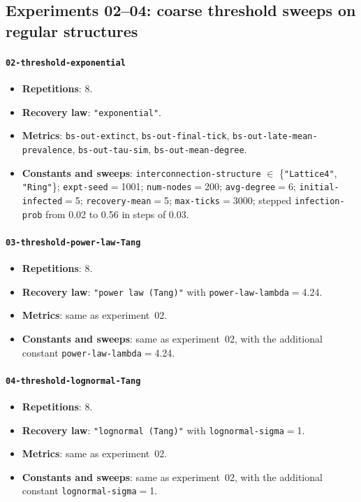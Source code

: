 \documentclass[11pt,a4paper]{article}
\begin{document}
\subsection{Experiments 02--04: coarse threshold sweeps on regular structures}
\paragraph{\texttt{02-threshold-exponential}}
\begin{itemize}[leftmargin=*]
  \item \textbf{Repetitions}: 8.
  \item \textbf{Recovery law}: \texttt{"exponential"}.
  \item \textbf{Metrics}: \texttt{bs-out-extinct}, \texttt{bs-out-final-tick}, \texttt{bs-out-late-mean-prevalence}, \texttt{bs-out-tau-sim}, \texttt{bs-out-mean-degree}.
  \item \textbf{Constants and sweeps}: \texttt{interconnection-structure} $\in$ \{\texttt{"Lattice4"}, \texttt{"Ring"}\}; \texttt{expt-seed}$=$1001; \texttt{num-nodes}$=$200; \texttt{avg-degree}$=$6; \texttt{initial-infected}$=$5; \texttt{recovery-mean}$=$5; \texttt{max-ticks}$=$3000; stepped \texttt{infection-prob} from 0.02 to 0.56 in steps of 0.03.
\end{itemize}

\paragraph{\texttt{03-threshold-power-law-Tang}}
\begin{itemize}[leftmargin=*]
  \item \textbf{Repetitions}: 8.
  \item \textbf{Recovery law}: \texttt{"power law (Tang)"} with \texttt{power-law-lambda}$=$4.24.
  \item \textbf{Metrics}: same as experiment~02.
  \item \textbf{Constants and sweeps}: same as experiment~02, with the additional constant \texttt{power-law-lambda}$=$4.24.
\end{itemize}

\paragraph{\texttt{04-threshold-lognormal-Tang}}
\begin{itemize}[leftmargin=*]
  \item \textbf{Repetitions}: 8.
  \item \textbf{Recovery law}: \texttt{"lognormal (Tang)"} with \texttt{lognormal-sigma}$=$1.
  \item \textbf{Metrics}: same as experiment~02.
  \item \textbf{Constants and sweeps}: same as experiment~02, with the additional constant \texttt{lognormal-sigma}$=$1.
\end{itemize}
\end{document}
